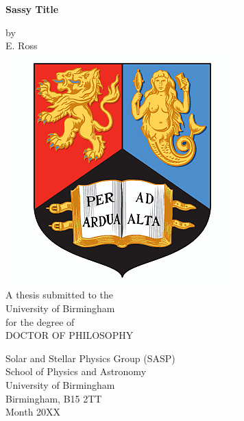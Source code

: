 \begin{titlepage}
\vspace{6cm}
\begin{center}
\begin{doublespace}
{\Huge \bf Sassy Title}
\end{doublespace}
\vspace{1cm}
by\\
\vspace{1cm}
{\Large E. Ross}\\
\vspace{2.5cm}
\includegraphics[scale=0.35]{onlyunilogo.png}\\
\vspace{2.5cm}
A thesis submitted to the \\
University of Birmingham \\
for the degree of \\
DOCTOR OF PHILOSOPHY\\
\end{center}
\vfill
\begin{flushright}     
Solar and Stellar Physics Group (SASP)\\
School of Physics and Astronomy \\
University of Birmingham \\
Birmingham, B15 2TT\\
Month 20XX\\
\vfill
\end{flushright}
\end{titlepage}
